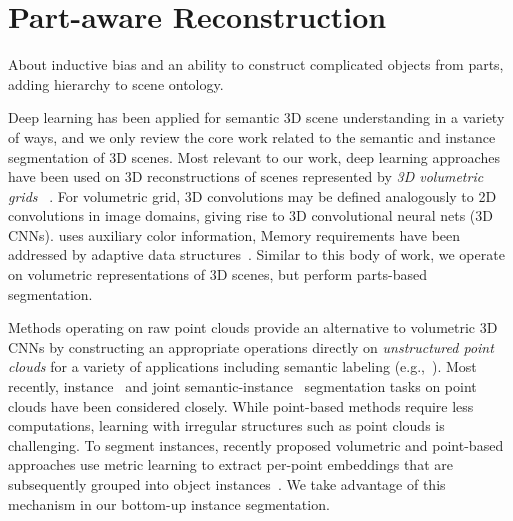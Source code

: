 \section{Part-aware Reconstruction}
\label{sec:part_reconstruction}

About inductive bias and an ability to construct complicated objects from parts, adding hierarchy to scene ontology.

Deep learning has been applied for semantic 3D scene understanding in a variety of ways, and we only review the core work related to the semantic and instance segmentation of 3D scenes. 
Most relevant to our work, deep learning approaches have been used on 3D reconstructions of scenes represented by \emph{3D volumetric grids} ~\cite{dai2017scannet,dai20183dmv,hou20193d,liu2019masc}. For volumetric grid, 3D convolutions may be defined analogously to 2D convolutions in image domains, giving rise to 3D convolutional neural nets (3D CNNs).
\cite{dai20183dmv} uses auxiliary color information, 
Memory requirements have been addressed by adaptive data structures~\cite{wang2017cnn}.
Similar to this body of work, we operate on volumetric representations of 3D scenes, but perform parts-based segmentation. %

Methods operating on raw point clouds provide an alternative to volumetric 3D CNNs by constructing an appropriate operations directly on \emph{unstructured point clouds} for a variety of applications including semantic labeling (e.g.,~\cite{qi2017pointnet,qi2017pointnet++,klokov2017escape,wang2018sgpn,wang2019dynamic}). Most recently, instance~\cite{elich20193d,liang20193d,elich20193d,yi2019gspn,yang2019learning,zhang2019point,engelmann20203d} and joint semantic-instance~\cite{wang2019associatively,pham2019jsis3d} segmentation tasks on point clouds have been considered closely. While point-based methods require less computations, learning with irregular structures such as point clouds is challenging.
To segment instances, recently proposed volumetric and point-based approaches use metric learning  to extract per-point embeddings that are subsequently grouped into object instances~\cite{elich20193d,yi2019gspn,lahoud20193d,liu2019masc}. We take advantage of this mechanism in our bottom-up instance segmentation.

